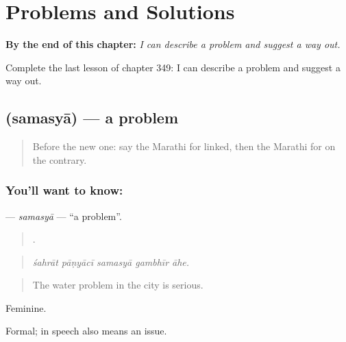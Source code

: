 
\chapter{Problems and Solutions}
\label{ch:mr-problems-and-solutions}

\begin{chapteropening}
\textbf{By the end of this chapter:} \emph{I can describe a problem and suggest a way out.}

Complete the last lesson of chapter 349: I can describe a problem and suggest a way out.
\end{chapteropening}

\section[\texorpdfstring{\mr{समस्या} (samasyā)}{समस्या (samasyā)}]{ (samasyā) — a problem}

\label{lesson:MR-C349-samasya}



\begin{quote}
Before the new one: say the Marathi for linked, then the Marathi for on the contrary.
\end{quote}

\subsection*{You'll want to know: }
\textbf{} — \emph{samasyā} — \textquotedblleft{}a problem\textquotedblright{}.

\begin{quote}
    .
\end{quote}

\begin{quote}
\emph{śahrāt pāṇyācī samasyā gambhīr āhe.}
\end{quote}

\begin{quote}
The water problem in the city is serious.
\end{quote}

Feminine.

Formal; in speech  also means an issue.

